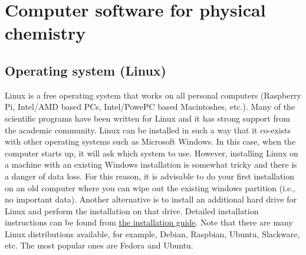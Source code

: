 \documentclass[byrevtex,amssymb,aps,pra,floatfix,letterpaper]{revtex4}
\begin{document}







\section{Computer software for physical chemistry}
\label{sec9}

\subsection{Operating system (Linux)}
\label{sec9.1}

Linux is a free operating system that works on all personal computers (Raspberry Pi, Intel/AMD based PCs, Intel/PowePC based Macintoshes, etc.). Many of the scientific programs have been written for Linux and it has strong support from the academic community. Linux can be installed in such a way that it co-exists with other operating systems such as Microsoft Windows. In this case, when the computer starts up, it will ask which system to use. However, installing Linux on a machine with an existing Windows installation is somewhat tricky and there is a danger of data loss. For this reason, it is advisable to do your first installation on an old computer where you can wipe out the existing windows partition (i.e., no important data). Another alternative is to install an additional hard drive for Linux and perform the installation on that drive. Detailed installation instructions can be found from \href{http://docs.fedoraproject.org/}{\underline{the installation guide}}. Note that there are many Linux distributions available, for example, Debian, Raspbian, Ubuntu, Slackware, etc. The most popular ones are Fedora and Ubuntu.
\end{document}
